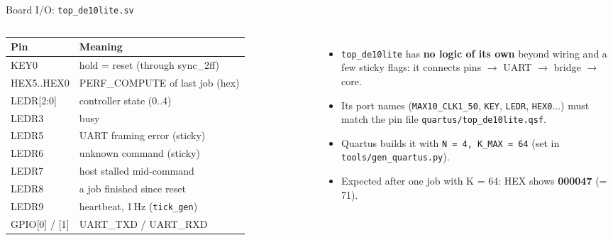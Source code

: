 \documentclass[aspectratio=169,11pt]{beamer}
\newcommand{\file}[1]{\texttt{\textcolor{copper}{#1}}}
\newcommand{\sig}[1]{\texttt{#1}}
\begin{document}
\begin{frame}{Board I/O: \file{top\_de10lite.sv}}
  \begin{columns}[T]
    \small
    \begin{tabular}{@{}l l@{}}
      \toprule
      \textbf{Pin} & \textbf{Meaning} \\
      \midrule
      KEY0 & hold = reset (through sync\_2ff) \\
      HEX5..HEX0 & PERF\_COMPUTE of last job (hex) \\
      LEDR[2:0] & controller state (0..4) \\
      LEDR3 & busy \\
      LEDR5 & UART framing error (sticky) \\
      LEDR6 & unknown command (sticky) \\
      LEDR7 & host stalled mid-command \\
      LEDR8 & a job finished since reset \\
      LEDR9 & heartbeat, 1\,Hz (\sig{tick\_gen}) \\
      GPIO[0] / [1] & UART\_TXD / UART\_RXD \\
      \bottomrule
    \end{tabular}
    \small
    \begin{itemize}
      \item \sig{top\_de10lite} has \textbf{no logic of its own} beyond wiring and a few
            sticky flags: it connects pins $\to$ UART $\to$ bridge $\to$ core.
      \item Its port names (\sig{MAX10\_CLK1\_50}, \sig{KEY}, \sig{LEDR}, \sig{HEX0}...) must match
            the pin file \file{quartus/top\_de10lite.qsf}.
      \item Quartus builds it with \sig{N = 4, K\_MAX = 64} (set in \file{tools/gen\_quartus.py}).
      \item Expected after one job with K = 64: HEX shows \textbf{000047} (= 71).
    \end{itemize}
  \end{columns}
\end{frame}
\end{document}
